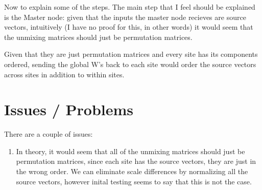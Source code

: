\documentclass{amsproc}
\begin{document}
Now to explain some of the steps. The main step that I feel should be explained is the Master node: given that the inputs the master node recieves are source vectors, intuitively (I have no proof for this, in other words) it would seem that the unmixing matrices should just be permutation matrices.

Given that they are just permutation matrices and every site has its components ordered, sending the global W's back to each site would order the source vectors across sites in addition to within sites.

\section{Issues / Problems}




There are a couple of issues: 

\begin{enumerate}
    \item In theory, it would seem that all of the unmixing matrices should just be permutation matrices, since each site has the source vectors, they are just in the wrong order. We can eliminate scale differences by normalizing all the source vectors, however inital testing seems to say that this is not the case.

\end{enumerate}
\end{document}
